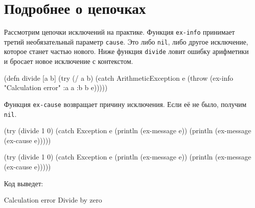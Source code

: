 \section{Подробнее о цепочках}


Рассмотрим цепочки исключений на практике. Функция \verb|ex-info|
принимает третий необязательный параметр \verb|cause|. Это либо \verb|nil|,
либо другое исключение, которое станет частью нового. Ниже функция
\verb|divide| ловит ошибку арифметики и бросает новое исключение с контекстом.


\label{re-throw-example}

\begin{english}
  \begin{clojure}
(defn divide [a b]
  (try
    (/ a b)
    (catch ArithmeticException e
      (throw (ex-info
               "Calculation error"
               {:a a :b b}
               e)))))
  \end{clojure}
\end{english}

Функция \verb|ex-cause| возвращает причину исключения. Если её не было,
получим \verb|nil|.

\ifx\devicetype\mobile

\begin{english}
  \begin{clojure}
(try
  (divide 1 0)
  (catch Exception e
    (println (ex-message e))
    (println (ex-message
               (ex-cause e)))))
  \end{clojure}
\end{english}

\else

\begin{english}
  \begin{clojure}
(try
  (divide 1 0)
  (catch Exception e
    (println (ex-message e))
    (println (ex-message (ex-cause e)))))
  \end{clojure}
\end{english}

\fi

\noindent
Код выведет:

\begin{english}
  \begin{text}
Calculation error
Divide by zero
  \end{text}
\end{english}

